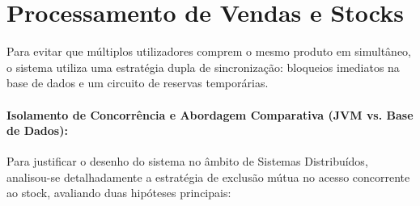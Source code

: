 \documentclass[11pt,a4paper,oneside]{report}
\begin{document}
\section{Processamento de Vendas e Stocks}
Para evitar que múltiplos utilizadores comprem o mesmo produto em simultâneo, o sistema utiliza uma estratégia dupla de sincronização: bloqueios imediatos na base de dados e um circuito de reservas temporárias.

\paragraph{Isolamento de Concorrência e Abordagem Comparativa (JVM vs. Base de Dados):}
Para justificar o desenho do sistema no âmbito de Sistemas Distribuídos, analisou-se detalhadamente a estratégia de exclusão mútua no acesso concorrente ao stock, avaliando duas hipóteses principais:
\end{document}
